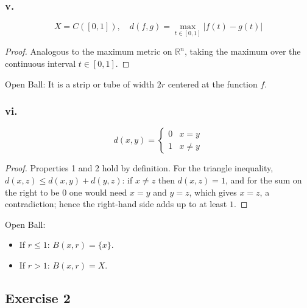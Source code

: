 \documentclass[11pt, a4paper]{article}
\begin{document}
\subsubsection*{v.}
$$ X = C([0,1]), \quad d(f, g) = \max_{t \in [0,1]} |f(t) - g(t)| $$

\begin{proof}
Analogous to the maximum metric on $\mathbb{R}^n$, taking the maximum over the continuous interval
$t \in [0,1]$.
\end{proof}

Open Ball: It is a strip or tube of width $2r$ centered at the function $f$.

\begin{figure}[H]
\centering
{}
\end{figure}

\subsubsection*{vi.}
$$ d(x, y) = \begin{cases} 0 & x=y \\ 1 & x \neq y \end{cases} $$

\begin{proof}
Properties 1 and 2 hold by definition. For the triangle inequality, $d(x, z) \le d(x, y) + d(y, z)$:
if $x \neq z$ then $d(x, z) = 1$, and for the sum on the right to be $0$ one would need $x = y$
and $y = z$, which gives $x = z$, a contradiction; hence the right-hand side adds up to at least $1$.
\end{proof}

Open Ball:
\begin{itemize}
    \item If $r \le 1$: $B(x, r) = \{x\}$.
    \item If $r > 1$: $B(x, r) = X$.
\end{itemize}

\subsection*{Exercise 2}
\end{document}
